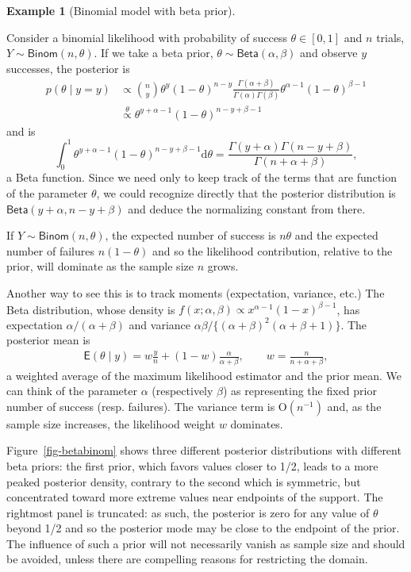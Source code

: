 \documentclass[
  11pt,
  letterpaper,
]{scrbook}
\theoremstyle{definition}
\theoremstyle{definition}
\newtheorem{example}{Example}[chapter]
\theoremstyle{definition}
\theoremstyle{plain}
\theoremstyle{plain}
\theoremstyle{remark}
\begin{document}
\begin{example}[Binomial model with beta
prior]\protect\hypertarget{exm-betabinomconjugate}{}\label{exm-betabinomconjugate}

Consider a binomial likelihood with probability of success
\(\theta \in [0,1]\) and \(n\) trials,
\(Y \sim \mathsf{Binom}(n, \theta)\). If we take a beta prior,
\(\theta \sim \mathsf{Beta}(\alpha, \beta)\) and observe \(y\)
successes, the posterior is \begin{align*}
p(\theta \mid y = y) &\propto \binom{n}{y} \theta^y (1-\theta)^{n-y} \frac{\Gamma(\alpha + \beta)}{\Gamma(\alpha) \Gamma(\beta)}\theta^{\alpha-1} (1-\theta)^{\beta-1}
\\&\stackrel{\theta}{\propto} \theta^{y+\alpha-1}(1-\theta)^{n-y+\beta-1}
\end{align*} and is
\[\int_{0}^{1} \theta^{y+\alpha-1}(1-\theta)^{n-y+\beta-1}\mathrm{d} \theta = \frac{\Gamma(y+\alpha)\Gamma(n-y+\beta)}{\Gamma(n+\alpha+\beta)},\]
a Beta function. Since we need only to keep track of the terms that are
function of the parameter \(\theta\), we could recognize directly that
the posterior distribution is \(\mathsf{Beta}(y+\alpha, n-y+\beta)\) and
deduce the normalizing constant from there.

If \(Y \sim \mathsf{Binom}(n, \theta)\), the expected number of success
is \(n\theta\) and the expected number of failures \(n(1-\theta)\) and
so the likelihood contribution, relative to the prior, will dominate as
the sample size \(n\) grows.

Another way to see this is to track moments (expectation, variance,
etc.) The Beta distribution, whose density is
\(f(x; \alpha, \beta) \propto x^{\alpha-1} (1-x)^{\beta-1}\), has
expectation \(\alpha/(\alpha+\beta)\) and variance
\(\alpha\beta/\{(\alpha+\beta)^2(\alpha+\beta+1)\}\). The posterior mean
is \begin{align*}
 \mathsf{E}(\theta \mid y) = w\frac{y}{n} + (1-w) \frac{\alpha}{\alpha+\beta}, 
 \qquad w = \frac{n}{n+\alpha + \beta},
 \end{align*} a weighted average of the maximum likelihood estimator and
the prior mean. We can think of the parameter \(\alpha\) (respectively
\(\beta\)) as representing the fixed prior number of success (resp.
failures). The variance term is \(\mathrm{O}(n^{-1})\) and, as the
sample size increases, the likelihood weight \(w\) dominates.

Figure~\ref{fig-betabinom} shows three different posterior distributions
with different beta priors: the first prior, which favors values closer
to 1/2, leads to a more peaked posterior density, contrary to the second
which is symmetric, but concentrated toward more extreme values near
endpoints of the support. The rightmost panel is truncated: as such, the
posterior is zero for any value of \(\theta\) beyond 1/2 and so the
posterior mode may be close to the endpoint of the prior. The influence
of such a prior will not necessarily vanish as sample size and should be
avoided, unless there are compelling reasons for restricting the domain.


\end{example}
\end{document}
